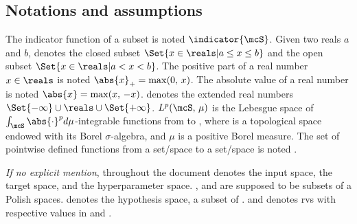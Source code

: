 \subsection{Notations and assumptions}\label{subsection:notations}
The indicator function of a subset \mcS is noted $\indicator{\mcS}$. Given two
reals $a$ and $b$,  denotes the closed subset $\Set{x \in
\reals | a \le x \le b}$ and  the open subset $\Set{x \in
\reals | a < x < b}$.  The positive part of a real number $x\in\reals$ is noted
$\abs{x}_+=\max(0,\,x)$. The absolute value of a real number is noted
$\abs{x}=\max(x,\,-x)$.  \extendedreals denotes the extended real numbers
$\Set{-\infty}\cup\reals\cup\Set{+\infty}$.  $L^p(\mcS,\,\mu)$ is the Lebesgue
space of $\int_{\mcS}\abs{\cdot}^pd\mu$-integrable functions from \mcS to
\reals, where \mcS is a topological space endowed with its Borel
$\sigma$-algebra, and $\mu$ is a positive Borel measure.  The set of pointwise
defined functions from a set/space \mcX to a set/space \mcY is noted
.
\par
%
\emph{If no explicit mention}, throughout the document  denotes
the input space, \outputspace the target space, and \hyperparameterspace the
hyperparameter space. , \outputspace and \hyperparameterspace are
supposed to be subsets of a Polish spaces.  \hypothesisspace denotes the
hypothesis space, a subset of .
 and \outputrandom denotes \acp{rv} with respective values in
 and \outputspace.
